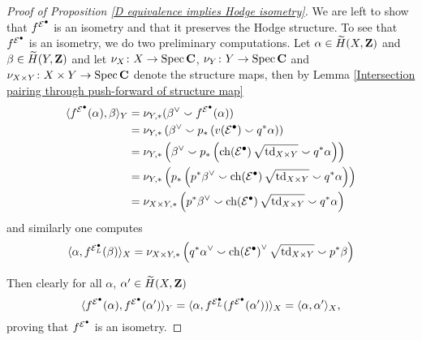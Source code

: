 \begin{proof}[Proof of Proposition \ref{D equivalence implies Hodge isometry}]
    We are left to show that $f^{\mathcal E^\bullet}$ is an isometry and that it preserves the Hodge structure. To see that $f^{\mathcal E^\bullet}$ is an isometry, we do two preliminary computations. Let $\alpha \in \widetilde{H}(X, \mathbf Z)$ and $\beta \in \widetilde{H}(Y, \mathbf Z)$ and let $\nu_X \colon X \to \operatorname{Spec}\mathbf C$, $\nu_Y \colon Y \to \operatorname{Spec}\mathbf C$ and $\nu_{X \times Y} \colon X \times Y \to \operatorname{Spec}\mathbf C$ denote the structure maps, then by Lemma \ref{Intersection pairing through push-forward of structure map}
    \begin{align*}
        \pairing{\fmcoh{\E^\bullet}(\alpha)}{\beta}_Y &= \nu_{Y, *}(\beta^\vee \smallsmile \fmcoh{\E^\bullet}(\alpha))
        \\
        &= \nu_{Y, *}\left(
            \beta^\vee \smallsmile p_*\left(v(\E^\bullet) \smallsmile q^*\alpha\right)\right) 
        \\
        &= \nu_{Y, *}\left(
            \beta^\vee \smallsmile p_*\left(\ch{\E^\bullet}
            {\sqrt{\tdclass{X \times Y}}}
            \smallsmile q^*\alpha\right)
        \right) 
        \\
        &= \nu_{Y, *}\left( 
            p_*\left(
                p^*\beta^\vee \smallsmile \ch{\E^\bullet}
                {\sqrt{\tdclass{X \times Y}}}
                \smallsmile q^*\alpha
            \right)
        \right) \\
        &= \nu_{X \times Y, *}\left(
            p^*\beta^\vee \smallsmile \ch{\E^\bullet}
                {\sqrt{\tdclass{X \times Y}}}
                \smallsmile q^*\alpha
        \right)
    \end{align*}
    and similarly one computes
    \[
        \pairing{\alpha}{\fmcoh{\E^\bullet_L}(\beta)}_X = \nu_{X \times Y, *}\left(
            q^*\alpha^\vee \smallsmile \ch{\E^\bullet}^\vee
                {\sqrt{\tdclass{X \times Y}}}
                \smallsmile p^*\beta
        \right)
    \]

    Then clearly for all $\alpha$, $\alpha' \in \widetilde{H}(X, \mathbf Z)$
    \[
        \langle f^{\mathcal E^\bullet}(\alpha), f^{\mathcal E^\bullet}(\alpha') \rangle_Y = 
        \langle \alpha, f^{\mathcal E^\bullet_L}(f^{\mathcal E^\bullet}(\alpha')) \rangle_X = 
        \langle \alpha, \alpha' \rangle_X,
    \]       
    proving that $f^{\mathcal E^\bullet}$ is an isometry. 


\end{proof}
